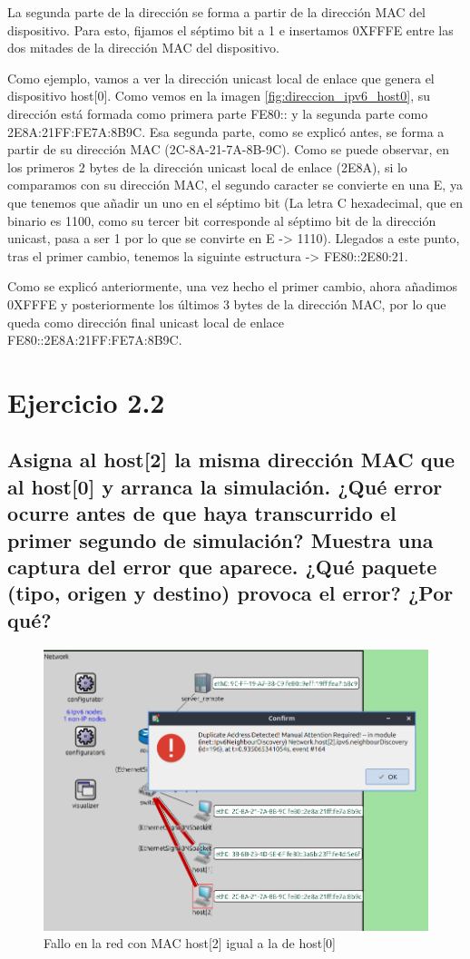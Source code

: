 La segunda parte de la dirección se forma a partir de la dirección MAC del dispositivo. Para esto, fijamos el séptimo bit a 1 e insertamos 0XFFFE entre las dos mitades de la dirección MAC del dispositivo. 

Como ejemplo, vamos a ver la dirección unicast local de enlace que genera el dispositivo host[0]. Como vemos en la imagen \ref{fig:direccion_ipv6_host0}, su dirección está formada como primera parte FE80:: y la segunda parte como 2E8A:21FF:FE7A:8B9C. Esa segunda parte, como se explicó antes, se forma a partir de su dirección MAC (2C-8A-21-7A-8B-9C). Como se puede observar, en los primeros 2 bytes de la dirección unicast local de enlace (2E8A), si lo comparamos con su dirección MAC, el segundo caracter se convierte en una E, ya que tenemos que añadir un uno en el séptimo bit (La letra C hexadecimal, que en binario es 1100, como su tercer bit corresponde al séptimo bit de la dirección unicast, pasa a ser 1 por lo que se convirte en E -> 1110). Llegados a este punto, tras el primer cambio, tenemos la siguinte estructura -> FE80::2E80:21.

Como se explicó anteriormente, una vez hecho el primer cambio, ahora añadimos 0XFFFE  y posteriormente los últimos 3 bytes de la dirección MAC, por lo que queda como dirección final unicast local de enlace\\ FE80::2E8A:21FF:FE7A:8B9C.


\section{Ejercicio 2.2}\label{chap:ejer22}
\subsection{Asigna al host[2] la misma dirección MAC que al host[0] y arranca la simulación. ¿Qué error ocurre antes de
que haya transcurrido el primer segundo de simulación? Muestra una captura del error que aparece. ¿Qué
paquete (tipo, origen y destino) provoca el error? ¿Por qué?}

\begin{figure}[!ht]
    \centering
    \includegraphics[width=135mm, scale=0.75]{imaxes/captura_ejer2_2.png}
    \caption{Fallo en la red con MAC host[2] igual a la de host[0]}
    \label{fig:fallo_ipv6_host2}
\end{figure}

